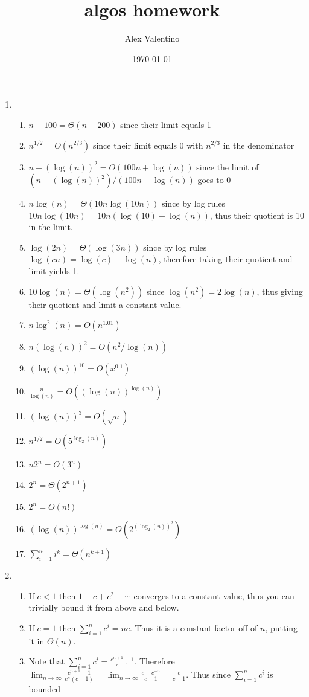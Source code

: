 \documentclass[12pt, letterpaper]{article}
\date{\today}
\author{Alex Valentino}
\title{algos homework}
\begin{document}
\begin{enumerate}
	\item
	\begin{enumerate}
		\item $n-100 = \Theta(n-200)$ since their limit equals 1
		\item $n^{1/2} = O(n^{2/3})$ since their limit equals 0 with $n^{2/3}$ 
		in the denominator
		\item $n + (\log(n))^2 = O(100n + \log(n))$ since the limit of $(n + (\log(n))^2)/(100n + \log(n))$ goes to 0
		\item $n \log(n) = \Theta(10n\log(10n))$ since by log rules 
		$10n\log(10n) = 10n(\log(10)+\log(n))$, thus their quotient is 10 in the 
		limit.
		\item $\log(2n) = \Theta(\log(3n))$ since by log rules $\log(cn) = \log(c) + \log(n)$, therefore taking their quotient and limit yields 1.
		\item $10 \log(n) = \Theta(\log(n^2))$ since $\log(n^2) = 2 \log(n)$, 
		thus giving their quotient and limit a constant value.
		\item $n \log^2(n) = O(n^{1.01})$
		\item $n (\log(n))^2 = O(n^2/\log(n))$
		\item $(\log(n))^{10} = O(x^{0.1})$
		\item $\frac{n}{\log(n)} = O((\log(n))^{\log(n)})$
		\item $(\log(n))^3 = O(\sqrt{n})$
		\item $n^{1/2} = O(5^{\log_2(n)})$
		\item $n2^n = O(3^n)$
		\item $2^n = \Theta(2^{n+1})$
		\item $2^n = O(n!)$
		\item $(\log(n))^{\log(n)} = O(2^{(\log_2(n))^2})$
		\item $\sum_{i=1}^n i^k = \Theta(n^{k+1})$
	\end{enumerate}
	\item
	\begin{enumerate}
		\item If $c < 1$ then $1 + c + c^2 + \cdots$ converges to a constant 
		value, thus you can trivially bound it from above and below.  
		\item If $c=1$ then $\sum_{i=1}^n c^i = nc$.  Thus it is a constant factor 
		off of $n$, putting it in $\Theta(n)$.
		\item Note that $\sum_{i=1}^n c^i = \frac{c^{n+1}-1}{c-1}$.  Therefore 
		$\lim_{n \to \infty} \frac{c^{n+1}-1}{c^n(c-1)} =\lim_{n \to \infty} \frac{c-c^{-n}}{c-1} = \frac{c}{c-1}$. Thus since $\sum_{i=1}^n c^i$ is bounded 

\end{enumerate}
\end{enumerate}
\end{document}
